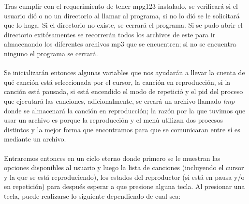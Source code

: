 \documentclass[12pt,a4paper]{article}
\begin{document}
    Tras cumplir con el requerimiento de tener mpg123 instalado, se verificará si el usuario dió o no un directorio al llamar al programa, si no lo dió se le solicitará que lo haga. Si el directorio no existe, se cerrará el programa. Si se pudo abrir el directorio exitósamentes se recorrerán todos los archivos de este para ir almacenando los diferentes archivos mp3 que se encuentren; si no se encuentra ninguno el programa se cerrará.
    \\\\
    Se inicializarán entonces algunas variables que nos ayudarán a llevar la cuenta de qué canción está seleccionada por el cursor,  la canción en reproducción, si la canción está pausada, si está encendido el modo de repetició y el pid del proceso que ejecutará las canciones, adicionalmente, se creará un archivo llamado \textit{tmp} donde se almacenará la canción en reproducción; la razón por la que tuvimos que usar un archivo es porque la reproducción y el menú utilizan dos procesos distintos y la mejor forma que encontramos para que se comunicaran entre sí es mediante un archivo.
    \\\\
    Entraremos entonces en un ciclo eterno donde primero se le muestran las opciones disponibles al usuario y luego la lista de canciones (incluyendo el cursor y la que se está reproduciendo), los estados del reproductor (si está en pausa y/o  en repetición) para después esperar a que presione alguna tecla. Al presionar una tecla, puede realizarse lo siguiente dependiendo de cual sea:
\end{document}
